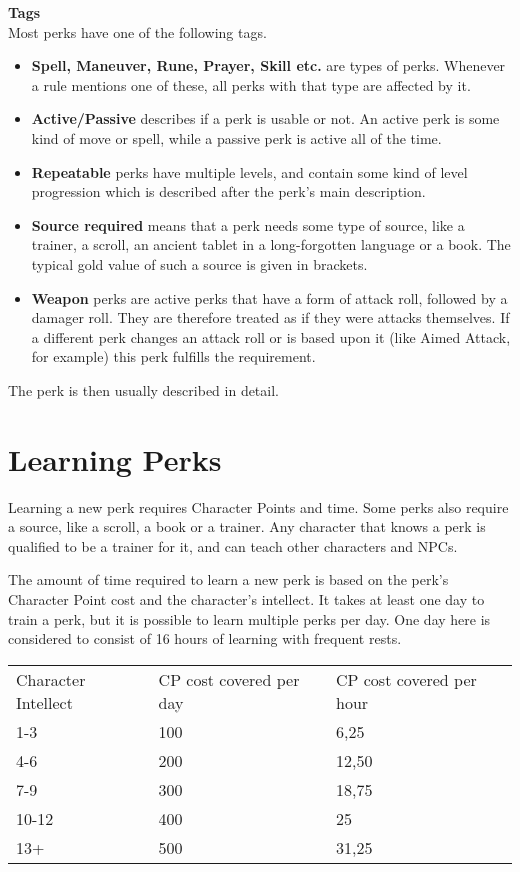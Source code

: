 \textbf{Tags}\\
Most perks have one of the following tags.\\
\begin{itemize}
	\item \textbf{Spell, Maneuver, Rune, Prayer, Skill etc.} are types of perks. Whenever a rule mentions one of these, all perks with that type are affected by it.\\
	\item \textbf{Active/Passive} describes if a perk is usable or not. An active perk is some kind of move or spell, while a passive perk is active all of the time.\\
	\item \textbf{Repeatable} perks have multiple levels, and contain some kind of level progression which is described after the perk's main description.\\
	\item \textbf{Source required} means that a perk needs some type of source, like a trainer, a scroll, an ancient tablet in a long-forgotten language or a book. The typical gold value of such a source is given in brackets.\\
	\item \textbf{Weapon} perks are active perks that have a form of attack roll, followed by a damager roll. They are therefore treated as if they were attacks themselves. If a different perk changes an attack roll or is based upon it (like Aimed Attack, for example) this perk fulfills the requirement.\\
\end{itemize}

The perk is then usually described in detail.

\section{Learning Perks}
Learning a new perk requires Character Points and time. Some perks also require a source, like a scroll, a book or a trainer. Any character that knows a perk is qualified to be a trainer for it, and can teach other characters and NPCs. 

The amount of time required to learn a new perk is based on the perk's Character Point cost and the character's intellect. It takes at least one day to train a perk, but it is possible to learn multiple perks per day. One day here is considered to consist of 16 hours of learning with frequent rests.\\

\begin{tabular}{l | l | l}
	Character Intellect & CP cost covered per day & CP cost covered per hour\\
	1-3 & 100 & 6,25\\
	4-6 & 200 & 12,50\\
	7-9 & 300 & 18,75\\
	10-12 & 400 & 25\\
	13+ & 500 & 31,25
\end{tabular}